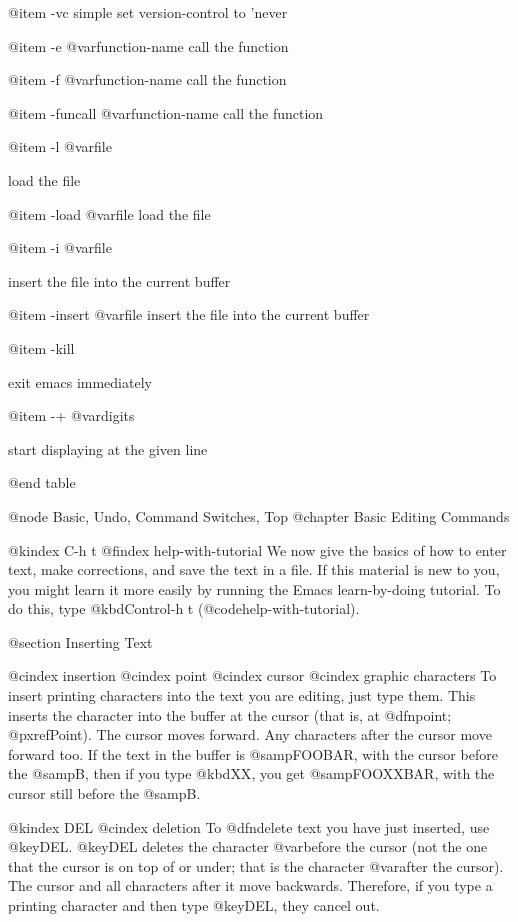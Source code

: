 {{{@item -vc simple 
set version-control to 'never

@item -e @var{function-name}
call the function

@item -f @var{function-name}
call the function

@item -funcall @var{function-name}
call the function

@item -l @var{file}

load the file


@item -load @var{file}
load the file

@item -i @var{file}

insert the file into the current buffer


@item -insert @var{file}
insert the file into the current buffer


@item -kill

exit emacs immediately


@item -+ @var{digits}

start displaying at the given line

@end table

@node Basic, Undo, Command Switches, Top
@chapter Basic Editing Commands

@kindex C-h t
@findex help-with-tutorial
  We now give the basics of how to enter text, make corrections, and
save the text in a file.  If this material is new to you, you might
learn it more easily by running the Emacs learn-by-doing tutorial.  To
do this, type @kbd{Control-h t} (@code{help-with-tutorial}).

@section Inserting Text

@cindex insertion
@cindex point
@cindex cursor
@cindex graphic characters
  To insert printing characters into the text you are editing, just type
them.  This inserts the character into the buffer at the cursor (that is,
at @dfn{point}; @pxref{Point}).  The cursor moves forward.  Any characters
after the cursor move forward too.  If the text in the buffer is
@samp{FOOBAR}, with the cursor before the @samp{B}, then if you type
@kbd{XX}, you get @samp{FOOXXBAR}, with the cursor still before the
@samp{B}.

@kindex DEL
@cindex deletion
   To @dfn{delete} text you have just inserted, use @key{DEL}.  @key{DEL}
deletes the character @var{before} the cursor (not the one that the cursor
is on top of or under; that is the character @var{after} the cursor).  The
cursor and all characters after it move backwards.  Therefore, if you type
a printing character and then type @key{DEL}, they cancel out.

}}}
